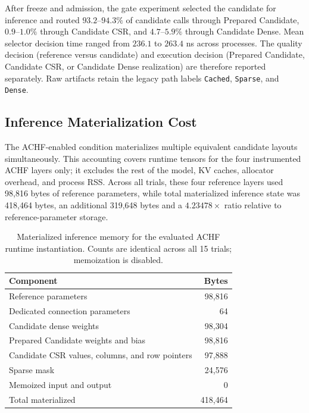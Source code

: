 \documentclass{article}
\begin{document}
After freeze and admission, the gate experiment selected the candidate for
inference and routed $93.2$--$94.3\%$ of candidate calls through Prepared
Candidate, $0.9$--$1.0\%$ through Candidate CSR, and $4.7$--$5.9\%$ through
Candidate Dense. Mean selector
decision time ranged from $236.1$ to $263.4$ ns across processes. The quality
decision (reference versus candidate) and execution decision (Prepared
Candidate, Candidate CSR, or Candidate Dense realization) are therefore
reported separately. Raw artifacts retain the legacy path labels
\texttt{Cached}, \texttt{Sparse}, and \texttt{Dense}.

\subsection{Inference Materialization Cost}

The ACHF-enabled condition materializes multiple equivalent candidate layouts
simultaneously. This accounting covers runtime tensors for the four instrumented
ACHF layers only; it excludes the rest of the model, KV caches, allocator
overhead, and process RSS. Across all trials, these four reference layers used
98,816 bytes of reference parameters, while total materialized inference state
was 418,464 bytes, an additional 319,648 bytes and a
$4.23478\times$ ratio relative to reference-parameter storage.

\begin{table}[t]
\centering
\caption{Materialized inference memory for the evaluated ACHF runtime
instantiation. Counts are identical across all 15 trials; memoization is
disabled.}
\label{tab:memory-cost}
\small
\begin{tabular}{lr}
\toprule
Component & Bytes \\
\midrule
Reference parameters & 98,816 \\
Dedicated connection parameters & 64 \\
Candidate dense weights & 98,304 \\
Prepared Candidate weights and bias & 98,816 \\
Candidate CSR values, columns, and row pointers & 97,888 \\
Sparse mask & 24,576 \\
Memoized input and output & 0 \\
\midrule
Total materialized & 418,464 \\
\bottomrule
\end{tabular}
\end{table}
\end{document}
